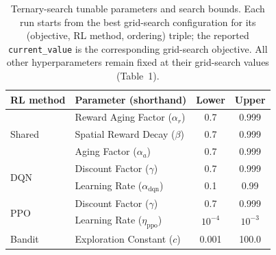 \begin{table}[t]
\centering
\caption{Ternary-search tunable parameters and search bounds.
Each run starts from the best grid-search configuration for its
(objective, RL method, ordering) triple; the reported \texttt{current\_value}
is the corresponding grid-search objective.
All other hyperparameters remain fixed at their grid-search values
(Table~1).}
\label{tab:ternary-search-tunable-params}
\begin{tabular}{|l|l|c|c|}
\hline
\textbf{RL method} & \textbf{Parameter (shorthand)} & \textbf{Lower} & \textbf{Upper} \\
\hline
\multirow{3}{*}{Shared}
  & Reward Aging Factor ($\alpha_r$) & 0.7 & 0.999 \\
  & Spatial Reward Decay ($\beta$) & 0.7 & 0.999 \\
  & Aging Factor ($\alpha_a$) & 0.7 & 0.999 \\
\hline
\multirow{2}{*}{DQN}
  & Discount Factor ($\gamma$) & 0.7 & 0.999 \\
  & Learning Rate ($\alpha_{\mathrm{dqn}}$) & 0.1 & 0.99 \\
\hline
\multirow{2}{*}{PPO}
  & Discount Factor ($\gamma$) & 0.7 & 0.999 \\
  & Learning Rate ($\eta_{\mathrm{ppo}}$) & $10^{-4}$ & $10^{-3}$ \\
\hline
Bandit
  & Exploration Constant ($c$) & 0.001 & 100.0 \\
\hline
\end{tabular}
\end{table}
